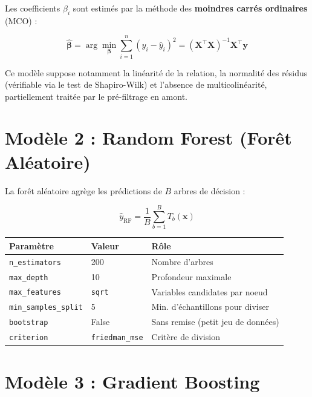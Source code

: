 \documentclass[12pt, a4paper, french]{report}
\begin{document}
Les coefficients $\beta_i$ sont estimés par la méthode des \textbf{moindres carrés ordinaires} (MCO) :

\begin{equation}
  \hat{\boldsymbol{\beta}}
  = \arg\min_{\boldsymbol{\beta}} \sum_{i=1}^n (y_i - \hat{y}_i)^2
  = (\mathbf{X}^\top \mathbf{X})^{-1} \mathbf{X}^\top \mathbf{y}
\end{equation}

Ce modèle suppose notamment la linéarité de la relation, la normalité des résidus (vérifiable via le test de Shapiro-Wilk) et l'absence de multicolinéarité, partiellement traitée par le pré-filtrage en amont.

\section{Modèle 2 : Random Forest (Forêt Aléatoire)}

La forêt aléatoire agrège les prédictions de $B$ arbres de décision :

\begin{equation}
  \hat{y}_{\text{RF}} = \frac{1}{B} \sum_{b=1}^{B} T_b(\mathbf{x})
\end{equation}

\begin{center}
\begin{tabular}{lll}
\toprule
\textbf{Paramètre} & \textbf{Valeur} & \textbf{Rôle}\\
\midrule
\texttt{n\_estimators}       & 200           & Nombre d'arbres\\
\texttt{max\_depth}          & 10            & Profondeur maximale\\
\texttt{max\_features}       & \texttt{sqrt} & Variables candidates par noeud\\
\texttt{min\_samples\_split} & 5             & Min. d'échantillons pour diviser\\
\texttt{bootstrap}           & False         & Sans remise (petit jeu de données)\\
\texttt{criterion}           & \texttt{friedman\_mse} & Critère de division\\
\bottomrule
\end{tabular}
\end{center}

\section{Modèle 3 : Gradient Boosting}
\end{document}
